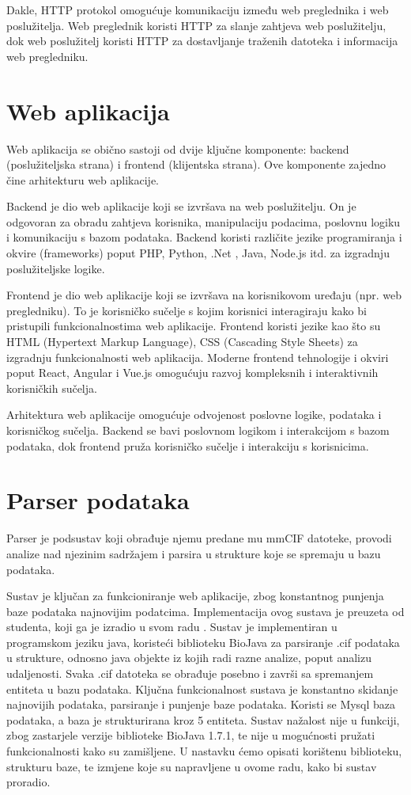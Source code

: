 \documentclass[times, utf8, zavrsni]{fer}
\begin{document}
Dakle, HTTP protokol omogućuje komunikaciju između web preglednika i web poslužitelja. Web preglednik koristi HTTP za slanje zahtjeva web poslužitelju, dok web poslužitelj koristi HTTP za dostavljanje traženih datoteka i informacija web pregledniku.
 
\section{Web aplikacija}
Web aplikacija se obično sastoji od dvije ključne komponente: backend (poslužiteljska strana) i frontend (klijentska strana). Ove komponente zajedno čine arhitekturu web aplikacije.

Backend je dio web aplikacije koji se izvršava na web poslužitelju. On je odgovoran za obradu zahtjeva korisnika, manipulaciju podacima, poslovnu logiku i komunikaciju s bazom podataka. Backend koristi različite jezike programiranja i okvire (frameworks) poput PHP, Python, .Net , Java, Node.js itd. za izgradnju poslužiteljske logike.

Frontend je dio web aplikacije koji se izvršava na korisnikovom uređaju (npr. web pregledniku). To je korisničko sučelje s kojim korisnici interagiraju kako bi pristupili funkcionalnostima web aplikacije. Frontend koristi jezike kao što su HTML (Hypertext Markup Language), CSS (Cascading Style Sheets) za izgradnju funkcionalnosti web aplikacija.  Moderne frontend tehnologije i okviri poput React, Angular i Vue.js omogućuju razvoj kompleksnih i interaktivnih korisničkih sučelja.

Arhitektura web aplikacije omogućuje odvojenost poslovne logike, podataka i korisničkog sučelja. Backend se bavi poslovnom logikom i interakcijom s bazom podataka, dok frontend pruža korisničko sučelje i interakciju s korisnicima.

\section{Parser podataka}
Parser je podsustav koji obrađuje njemu predane mu mmCIF datoteke, provodi analize nad njezinim sadržajem i parsira u strukture koje se spremaju u bazu podataka.

Sustav je ključan za funkcioniranje web aplikacije, zbog konstantnog punjenja baze podataka najnovijim podatcima. Implementacija ovog sustava je preuzeta od 
studenta, koji ga je izradio u svom radu \cite{alanTus2010}. Sustav je implementiran u programskom jeziku java, koristeći biblioteku BioJava za parsiranje .cif podataka u
strukture, odnosno java objekte iz kojih radi razne analize, poput analizu udaljenosti. Svaka .cif datoteka se obrađuje posebno i završi sa spremanjem entiteta u bazu podataka. Ključna funkcionalnost sustava je konstantno skidanje najnovijih podataka, parsiranje i punjenje baze podataka. Koristi se Mysql baza podataka, a baza je
strukturirana kroz 5 entiteta. Sustav nažalost nije u funkciji, zbog zastarjele verzije biblioteke BioJava 1.7.1, te nije u mogućnosti pružati funkcionalnosti kako su zamišljene. U nastavku ćemo opisati korištenu biblioteku, strukturu baze, te izmjene koje su napravljene u ovome radu, kako bi sustav proradio.
\end{document}

